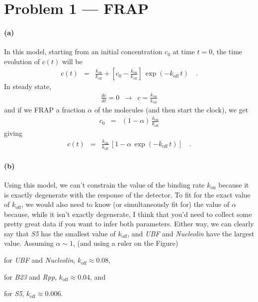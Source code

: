 \documentclass[12pt]{article}
\begin{document}
\section{Problem 1 --- FRAP}

\paragraph{(a)}

In this model, starting from an initial concentration $c_0$ at time $t=0$, the
time evolution of $c(t)$ will be
\begin{eqnarray}
c(t) &=& \frac{k_\mathrm{on}}{k_\mathrm{off}}
    + \left[ c_0 - \frac{k_\mathrm{on}}{k_\mathrm{off}} \right] \,
    \exp \left( -k_\mathrm{off}\,t \right) \quad.
\end{eqnarray}
In steady state,
\begin{eqnarray}
\frac{dc}{dt} = 0 &\rightarrow& c = \frac{k_\mathrm{on}}{k_\mathrm{off}}
\end{eqnarray}
and if we FRAP a fraction $\alpha$ of the molecules (and then start the
clock), we get
\begin{eqnarray}
c_0 &=& (1-\alpha)\,\frac{k_\mathrm{on}}{k_\mathrm{off}}
\end{eqnarray}
giving
\begin{eqnarray}
c(t) &=& \frac{k_\mathrm{on}}{k_\mathrm{off}} \,
    \left [
        1 - \alpha\,\exp \left( -k_\mathrm{off}\,t \right)
    \right ] \quad.
\end{eqnarray}

\paragraph{(b)}

Using this model, we can't constrain the value of the binding rate
$k_\mathrm{on}$ because it is exactly degenerate with the response of the
detector.
To fit for the exact value of $k_\mathrm{off}$, we would also need to know (or
simultaneously fit for) the value of $\alpha$ because, while it isn't exactly
degenerate, I think that you'd need to collect some pretty great data if you
want to infer both parameters.
Either way, we can clearly say that \emph{S5} has the smallest value of
$k_\mathrm{off}$, and \emph{UBF} and \emph{Nucleolin} have the largest value.
Assuming $\alpha \sim 1$, (and using a ruler on the Figure)
\begin{itemize}
{\item for \emph{UBF} and \emph{Nucleolin}, $k_\mathrm{off} \approx 0.08$,}
{\item for \emph{B23} and \emph{Rpp}, $k_\mathrm{off} \approx 0.04$, and}
{\item for \emph{S5}, $k_\mathrm{off} \approx 0.006$.}
\end{itemize}
\end{document}
